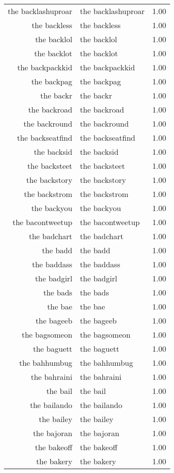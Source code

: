 \begin{table}[ht]
\begin{tabular}{rlr}
  the backlashuproar & the backlashuproar & 1.00 \\ 
  the backless & the backless & 1.00 \\ 
  the backlol & the backlol & 1.00 \\ 
  the backlot & the backlot & 1.00 \\ 
  the backpackkid & the backpackkid & 1.00 \\ 
  the backpag & the backpag & 1.00 \\ 
  the backr & the backr & 1.00 \\ 
  the backroad & the backroad & 1.00 \\ 
  the backround & the backround & 1.00 \\ 
  the backseatfind & the backseatfind & 1.00 \\ 
  the backsid & the backsid & 1.00 \\ 
  the backsteet & the backsteet & 1.00 \\ 
  the backstory & the backstory & 1.00 \\ 
  the backstrom & the backstrom & 1.00 \\ 
  the backyou & the backyou & 1.00 \\ 
  the bacontweetup & the bacontweetup & 1.00 \\ 
  the badchart & the badchart & 1.00 \\ 
  the badd & the badd & 1.00 \\ 
  the baddass & the baddass & 1.00 \\ 
  the badgirl & the badgirl & 1.00 \\ 
  the bads & the bads & 1.00 \\ 
  the bae & the bae & 1.00 \\ 
  the bageeb & the bageeb & 1.00 \\ 
  the bagsomeon & the bagsomeon & 1.00 \\ 
  the baguett & the baguett & 1.00 \\ 
  the bahhumbug & the bahhumbug & 1.00 \\ 
  the bahraini & the bahraini & 1.00 \\ 
  the bail & the bail & 1.00 \\ 
  the bailando & the bailando & 1.00 \\ 
  the bailey & the bailey & 1.00 \\ 
  the bajoran & the bajoran & 1.00 \\ 
  the bakeoff & the bakeoff & 1.00 \\ 
  the bakery & the bakery & 1.00 \\ 

\end{tabular}
\end{table}
